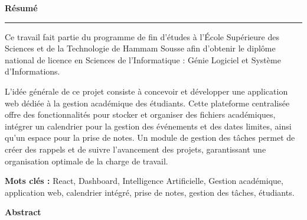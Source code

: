\pagestyle{empty} %

\vspace*{\fill}

\begin{center}
  \fontsize{20}{20}\selectfont\bfseries Résumé
\end{center}
\hrule

\vspace{1cm}

Ce travail fait partie du programme de fin d’études à l'École Supérieure des Sciences et de la Technologie de Hammam Sousse afin d'obtenir le diplôme national de licence en Sciences de l'Informatique : Génie Logiciel et Système d’Informations.
\par \vspace{5mm}
L’idée générale de ce projet consiste à concevoir et développer une application web dédiée à la gestion académique des étudiants. Cette plateforme centralisée offre des fonctionnalités pour stocker et organiser des fichiers académiques, intégrer un calendrier pour la gestion des événements et des dates limites, ainsi qu'un espace pour la prise de notes. Un module de gestion des tâches permet de créer des rappels et de suivre l'avancement des projets, garantissant une organisation optimale de la charge de travail.
\par \vspace{5mm}
\textbf{Mots clés : } React, Dashboard, Intelligence Artificielle, Gestion académique, application web, calendrier intégré, prise de notes, gestion des tâches, étudiants.

\vspace{3cm}

\begin{center}
  \fontsize{20}{20}\selectfont\bfseries Abstract
\end{center}

